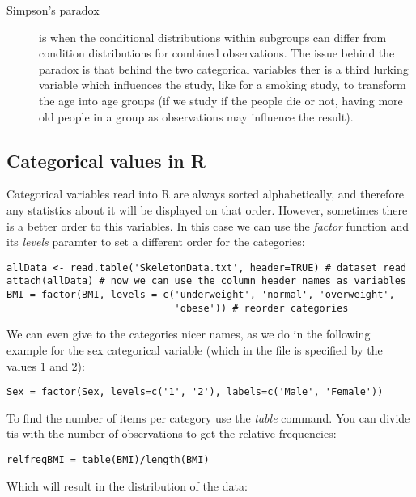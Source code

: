 \begin{description}
  \item[Simpson's paradox] is when the conditional distributions within
  subgroups can differ from condition distributions for combined observations.
  The issue behind the paradox is that behind the two categorical variables ther
  is a third lurking variable which influences the study, like for a smoking
  study, to transform the age into age groups (if we study if the people die
  or not, having more old people in a group as observations may influence the
  result).
\end{description}
\subsection{Categorical values in R}

Categorical variables read into R are always sorted alphabetically, and
therefore any statistics about it will be displayed on that order. However,
sometimes there is a better order to this variables. In this case we can use the
\emph{factor} function and its \emph{levels} paramter to set a different order
for the categories: 

\begin{verbatim}
allData <- read.table('SkeletonData.txt', header=TRUE) # dataset read 
attach(allData) # now we can use the column header names as variables
BMI = factor(BMI, levels = c('underweight', 'normal', 'overweight', 
                             'obese')) # reorder categories
\end{verbatim}

We can even give to the categories nicer names, as we do in the following
example for the sex categorical variable (which in the file is specified by the
values $1$ and $2$): 

\begin{verbatim}
Sex = factor(Sex, levels=c('1', '2'), labels=c('Male', 'Female'))
\end{verbatim}

To find the number of items per category use the \emph{table} command. You can
divide tis with the number of observations to get the relative frequencies:

\begin{verbatim}
relfreqBMI = table(BMI)/length(BMI)
\end{verbatim}

Which will result in the distribution of the data:


